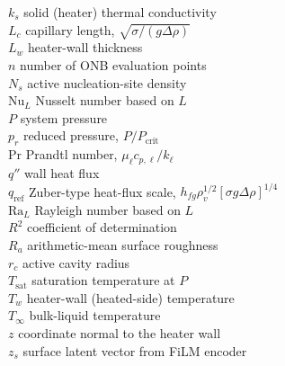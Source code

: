 \begin{tabbing}
$k_s$              \> solid (heater) thermal conductivity                 \> [\si{W/(m.K)}] \\
$L_c$              \> capillary length, $\sqrt{\sigma/(g\Delta\rho)}$     \> [m] \\
$L_w$              \> heater-wall thickness                               \> [m] \\
$n$                \> number of ONB evaluation points                     \> [---] \\
$N_s$              \> active nucleation-site density                      \> [\si{1/cm^2}] \\
$\mathrm{Nu}_L$    \> Nusselt number based on $L$                         \> [---] \\
$P$                \> system pressure                                     \> [Pa] \\
$p_r$              \> reduced pressure, $P/P_{\mathrm{crit}}$             \> [---] \\
$\mathrm{Pr}$      \> Prandtl number, $\mu_{\ell}c_{p,\ell}/k_{\ell}$     \> [---] \\
$q''$              \> wall heat flux                                      \> [\si{W/m^2}] \\
$q_{\mathrm{ref}}$ \> Zuber-type heat-flux scale, $h_{fg}\rho_v^{1/2}[\sigma g\Delta\rho]^{1/4}$ \> [\si{W/m^2}] \\
$\mathrm{Ra}_L$    \> Rayleigh number based on $L$                        \> [---] \\
$R^{2}$            \> coefficient of determination                        \> [---] \\
$R_a$              \> arithmetic-mean surface roughness                   \> [\si{\micro m}] \\
$r_c$              \> active cavity radius                                \> [\si{\micro m}] \\
$T_{\mathrm{sat}}$ \> saturation temperature at $P$                       \> [K] \\
$T_w$              \> heater-wall (heated-side) temperature               \> [K] \\
$T_{\infty}$       \> bulk-liquid temperature                             \> [K] \\
$z$                \> coordinate normal to the heater wall                \> [m] \\
$z_s$              \> surface latent vector from FiLM encoder             \> [---] \\
\end{tabbing}

